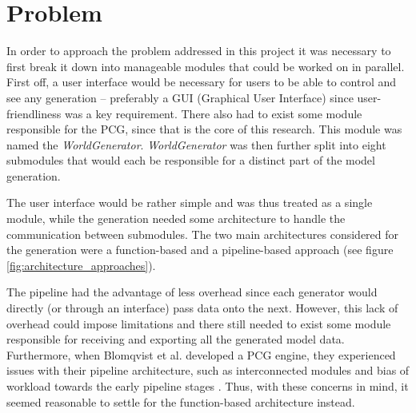 \section{Problem}

In order to approach the problem addressed in this project it was necessary to first break it down into manageable modules that could be worked on in parallel.
First off, a user interface would be necessary for users to be able to control and see any generation -- preferably a GUI (Graphical User Interface) since user-friendliness was a key requirement.
There also had to exist some module responsible for the PCG, since that is the core of this research.
This module was named the \textit{WorldGenerator}.
\textit{WorldGenerator} was then further split into eight submodules that would each be responsible for a distinct part of the model generation.

The user interface would be rather simple and was thus treated as a single module, while the generation needed some architecture to handle the communication between submodules.
The two main architectures considered for the generation were a function-based and a pipeline-based approach (see figure \ref{fig:architecture_approaches}).

The pipeline had the advantage of less overhead since each generator would directly (or through an interface) pass data onto the next.
However, this lack of overhead could impose limitations and there still needed to exist some module responsible for receiving and exporting all the generated model data.
Furthermore, when Blomqvist et al. developed a PCG engine, they experienced issues with their pipeline architecture, such as interconnected modules and bias of workload towards the early pipeline stages \cite[p. 45]{ba_landscape}.
Thus, with these concerns in mind, it seemed reasonable to settle for the function-based architecture instead.

\newpage

